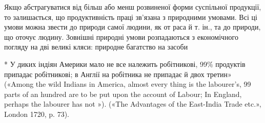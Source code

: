 Якщо абстрагуватися від більш або менш розвиненої форми
суспільної продукції, то залишається, що продуктивність праці
зв’язана з природними умовами. Всі ці умови можна звести до
природи самої людини, як от раса й т. ін., та до природи, що оточує
людину. Зовнішні природні умови розпадаються з економічного
погляду на дві великі кляси: природне багатство на засоби

* У диких індіян Америки мало не все належить робітникові, 99\%
продуктів припадає робітникові; в Англії на робітника не припадає й
двох третин» («Among the wild Indians in America, almost every thing
is the labourer’s, 99 parts of an hundred are to be put upon the account of
Labour; In England, perhaps the labourer has not »). («The Advantages
of the East-India Trade etc.», London 1720, p. 73).
\parbreak{}  %
